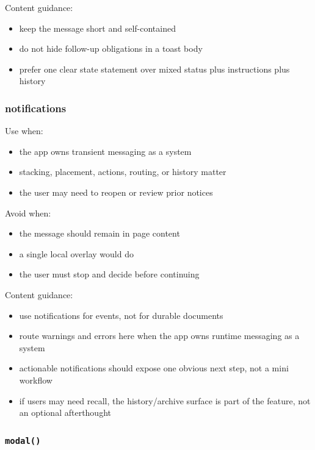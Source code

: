 Content guidance:

\begin{itemize}
\tightlist
\item
  keep the message short and self-contained
\item
  do not hide follow-up obligations in a toast body
\item
  prefer one clear state statement over mixed status plus instructions plus history
\end{itemize}

\subsubsection{notifications}\label{record-023-notifications}

Use when:

\begin{itemize}
\tightlist
\item
  the app owns transient messaging as a system
\item
  stacking, placement, actions, routing, or history matter
\item
  the user may need to reopen or review prior notices
\end{itemize}

Avoid when:

\begin{itemize}
\tightlist
\item
  the message should remain in page content
\item
  a single local overlay would do
\item
  the user must stop and decide before continuing
\end{itemize}

Content guidance:

\begin{itemize}
\tightlist
\item
  use notifications for events, not for durable documents
\item
  route warnings and errors here when the app owns runtime messaging as a system
\item
  actionable notifications should expose one obvious next step, not a mini workflow
\item
  if users may need recall, the history/archive surface is part of the feature, not an optional afterthought
\end{itemize}

\subsubsection{\texorpdfstring{\texttt{m\allowbreak{}o\allowbreak{}d\allowbreak{}a\allowbreak{}l\allowbreak{}(\allowbreak{})}}{}}\label{record-023-modal}

